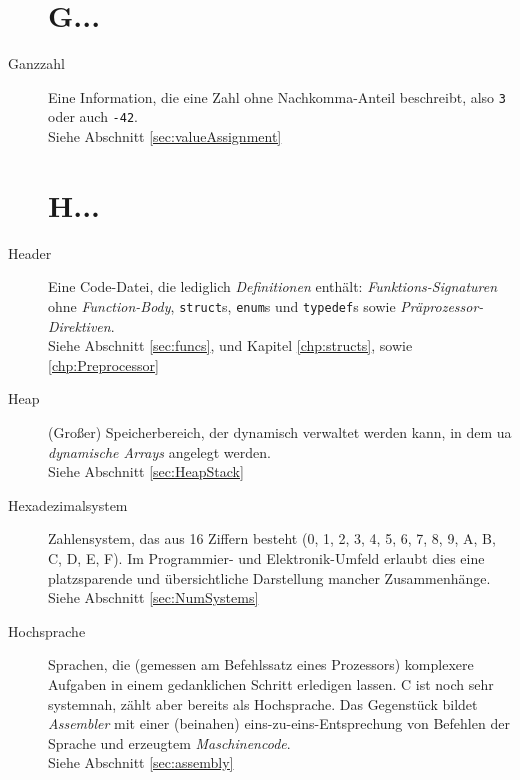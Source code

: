 \begin{appendices}
\begin{description}
\section*{G...}
\item[Ganzzahl] Eine Information, die eine Zahl ohne Nachkomma-Anteil beschreibt, also \eg
	\texttt{3} oder auch \texttt{-42}.\\
	Siehe Abschnitt \ref{sec:valueAssignment}

\section*{H...}
\item[Header] Eine Code-Datei, die lediglich \emph{Definitionen} enthält: \emph{Funktions-Signaturen}
	ohne \emph{Function-Body}, \texttt{struct}s, \texttt{enum}s und 
	\texttt{typedef}s sowie \emph{Präprozessor-Direktiven}.\\
	Siehe Abschnitt \ref{sec:funcs}, und Kapitel \ref{chp:structs}, sowie \ref{chp:Preprocessor}
\item[Heap] (Großer) Speicherbereich, der dynamisch verwaltet werden kann, \ie in dem ua
	\emph{dynamische Arrays} angelegt werden.\\
	Siehe Abschnitt \ref{sec:HeapStack}
\item[Hexadezimalsystem] Zahlensystem, das aus 16 Ziffern besteht (0, 1, 2, 3, 4, 5, 6, 7, 8, 9, A, B,
	C, D, E, F). Im Programmier- und Elektronik-Umfeld erlaubt dies eine platzsparende und
	übersichtliche Darstellung mancher Zusammenhänge.\newline
	Siehe Abschnitt \ref{sec:NumSystems}
\item[Hochsprache] Sprachen, die (gemessen am Befehlssatz eines Prozessors) komplexere Aufgaben in
	einem gedanklichen Schritt erledigen lassen. C ist noch sehr systemnah, zählt aber bereits als
	Hochsprache. Das Gegenstück bildet \emph{Assembler} mit einer (beinahen) eins-zu-eins-Entsprechung
	von Befehlen der Sprache und erzeugtem \emph{Maschinencode}.\\
	Siehe Abschnitt \ref{sec:assembly}


\end{description}
\end{appendices}
